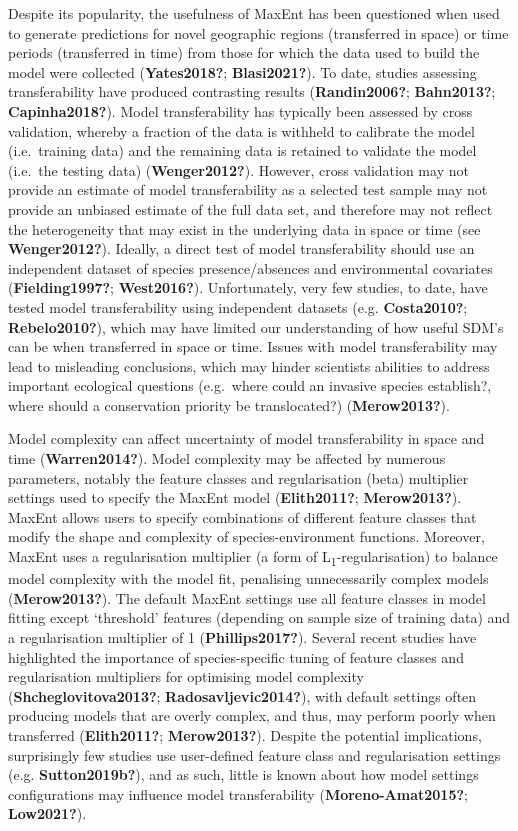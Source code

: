 \documentclass[12pt,]{article}
\begin{document}
Despite its popularity, the usefulness of MaxEnt has been questioned
when used to generate predictions for novel geographic regions
(transferred in space) or time periods (transferred in time) from those
for which the data used to build the model were collected
(\textbf{Yates2018?}; \textbf{Blasi2021?}). To date, studies assessing
transferability have produced contrasting results (\textbf{Randin2006?};
\textbf{Bahn2013?}; \textbf{Capinha2018?}). Model transferability has
typically been assessed by cross validation, whereby a fraction of the
data is withheld to calibrate the model (i.e.~training data) and the
remaining data is retained to validate the model (i.e.~the testing data)
(\textbf{Wenger2012?}). However, cross validation may not provide an
estimate of model transferability as a selected test sample may not
provide an unbiased estimate of the full data set, and therefore may not
reflect the heterogeneity that may exist in the underlying data in space
or time (see \textbf{Wenger2012?}). Ideally, a direct test of model
transferability should use an independent dataset of species
presence/absences and environmental covariates (\textbf{Fielding1997?};
\textbf{West2016?}). Unfortunately, very few studies, to date, have
tested model transferability using independent datasets (e.g.
\textbf{Costa2010?}; \textbf{Rebelo2010?}), which may have limited our
understanding of how useful SDM's can be when transferred in space or
time. Issues with model transferability may lead to misleading
conclusions, which may hinder scientists abilities to address important
ecological questions (e.g.~where could an invasive species establish?,
where should a conservation priority be translocated?)
(\textbf{Merow2013?}).

Model complexity can affect uncertainty of model transferability in
space and time (\textbf{Warren2014?}). Model complexity may be affected
by numerous parameters, notably the feature classes and regularisation
(beta) multiplier settings used to specify the MaxEnt model
(\textbf{Elith2011?}; \textbf{Merow2013?}). MaxEnt allows users to
specify combinations of different feature classes that modify the shape
and complexity of species-environment functions. Moreover, MaxEnt uses a
regularisation multiplier (a form of L\textsubscript{1}-regularisation)
to balance model complexity with the model fit, penalising unnecessarily
complex models (\textbf{Merow2013?}). The default MaxEnt settings use
all feature classes in model fitting except `threshold' features
(depending on sample size of training data) and a regularisation
multiplier of 1 (\textbf{Phillips2017?}). Several recent studies have
highlighted the importance of species-specific tuning of feature classes
and regularisation multipliers for optimising model complexity
(\textbf{Shcheglovitova2013?}; \textbf{Radosavljevic2014?}), with
default settings often producing models that are overly complex, and
thus, may perform poorly when transferred (\textbf{Elith2011?};
\textbf{Merow2013?}). Despite the potential implications, surprisingly
few studies use user-defined feature class and regularisation settings
(e.g. \textbf{Sutton2019b?}), and as such, little is known about how
model settings configurations may influence model transferability
(\textbf{Moreno-Amat2015?}; \textbf{Low2021?}).
\end{document}
